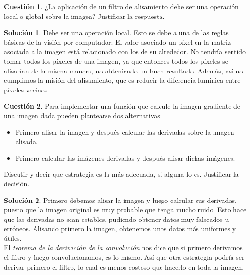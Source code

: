 \documentclass[a4paper, 11pt]{article}
\theoremstyle{definition}
\newtheorem{cuestion}{Cuestión}
\newtheorem*{solucion}{Solución}
\begin{document}
  \begin{cuestion}
      ¿La aplicación de un filtro de alisamiento debe ser una operación
      local o global sobre la imagen? Justificar la respuesta.
  \end{cuestion}

  \begin{solucion}
      Debe ser una operación local. Esto se debe a una de las reglas básicas de la
      visión por computador: El valor asociado un píxel en la matriz asociada a la imagen
      está relacionado con los de su alrededor.
      No tendría sentido tomar todos los píxeles de una imagen,
      ya que entonces todos los píxeles se alisarían de la misma manera, no obteniendo
      un buen resultado. Además, así no cumplimos la misión del alisamiento, que
      es reducir la diferencia lumínica entre píxeles vecinos.
  \end{solucion}

  \begin{cuestion}
      Para implementar una función que calcule la imagen gradiente de una
      imagen dada pueden plantearse dos alternativas:
      \begin{itemize}
      	\item Primero alisar la imagen y después calcular las derivadas sobre la imagen alisada.
      	\item Primero calcular las imágenes derivadas y después alisar dichas imágenes.
      \end{itemize}
      Discutir y decir que estrategia es la más adecuada, si alguna lo es. Justificar la decisión.

  \end{cuestion}

  \begin{solucion}
      Primero debemos alisar la imagen y luego calcular sus derivadas, puesto que la imagen
      original es muy probable que tenga mucho ruido. Esto hace que las derivadas no
      sean estables, pudiendo obtener datos muy falseados u erróneos. Alisando primero la
      imagen, obtenemos unos datos más uniformes y útiles.\\

      El \textit{teorema de la derivación de la convolución} nos dice que si primero
      derivamos el filtro y luego convolucionamos, es lo mismo. Así que otra
      estrategia podría ser derivar primero el filtro, lo cual es menos costoso
      que hacerlo en toda la imagen.
  \end{solucion}
\end{document}
